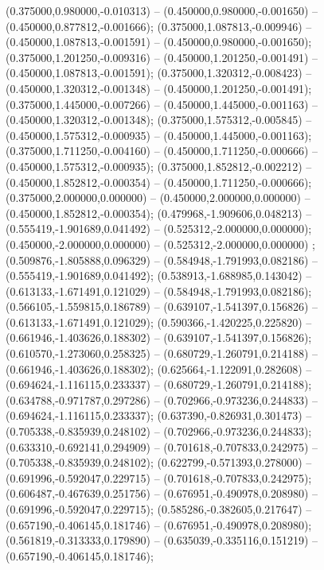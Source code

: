  (0.375000,0.980000,-0.010313) -- (0.450000,0.980000,-0.001650) -- (0.450000,0.877812,-0.001666);
 (0.375000,1.087813,-0.009946) -- (0.450000,1.087813,-0.001591) -- (0.450000,0.980000,-0.001650);
 (0.375000,1.201250,-0.009316) -- (0.450000,1.201250,-0.001491) -- (0.450000,1.087813,-0.001591);
 (0.375000,1.320312,-0.008423) -- (0.450000,1.320312,-0.001348) -- (0.450000,1.201250,-0.001491);
 (0.375000,1.445000,-0.007266) -- (0.450000,1.445000,-0.001163) -- (0.450000,1.320312,-0.001348);
 (0.375000,1.575312,-0.005845) -- (0.450000,1.575312,-0.000935) -- (0.450000,1.445000,-0.001163);
 (0.375000,1.711250,-0.004160) -- (0.450000,1.711250,-0.000666) -- (0.450000,1.575312,-0.000935);
 (0.375000,1.852812,-0.002212) -- (0.450000,1.852812,-0.000354) -- (0.450000,1.711250,-0.000666);
 (0.375000,2.000000,0.000000) -- (0.450000,2.000000,0.000000) -- (0.450000,1.852812,-0.000354);
 (0.479968,-1.909606,0.048213) -- (0.555419,-1.901689,0.041492) -- (0.525312,-2.000000,0.000000);
 (0.450000,-2.000000,0.000000) -- (0.525312,-2.000000,0.000000) ;
 (0.509876,-1.805888,0.096329) -- (0.584948,-1.791993,0.082186) -- (0.555419,-1.901689,0.041492);
 (0.538913,-1.688985,0.143042) -- (0.613133,-1.671491,0.121029) -- (0.584948,-1.791993,0.082186);
 (0.566105,-1.559815,0.186789) -- (0.639107,-1.541397,0.156826) -- (0.613133,-1.671491,0.121029);
 (0.590366,-1.420225,0.225820) -- (0.661946,-1.403626,0.188302) -- (0.639107,-1.541397,0.156826);
 (0.610570,-1.273060,0.258325) -- (0.680729,-1.260791,0.214188) -- (0.661946,-1.403626,0.188302);
 (0.625664,-1.122091,0.282608) -- (0.694624,-1.116115,0.233337) -- (0.680729,-1.260791,0.214188);
 (0.634788,-0.971787,0.297286) -- (0.702966,-0.973236,0.244833) -- (0.694624,-1.116115,0.233337);
 (0.637390,-0.826931,0.301473) -- (0.705338,-0.835939,0.248102) -- (0.702966,-0.973236,0.244833);
 (0.633310,-0.692141,0.294909) -- (0.701618,-0.707833,0.242975) -- (0.705338,-0.835939,0.248102);
 (0.622799,-0.571393,0.278000) -- (0.691996,-0.592047,0.229715) -- (0.701618,-0.707833,0.242975);
 (0.606487,-0.467639,0.251756) -- (0.676951,-0.490978,0.208980) -- (0.691996,-0.592047,0.229715);
 (0.585286,-0.382605,0.217647) -- (0.657190,-0.406145,0.181746) -- (0.676951,-0.490978,0.208980);
 (0.561819,-0.313333,0.179890) -- (0.635039,-0.335116,0.151219) -- (0.657190,-0.406145,0.181746);
